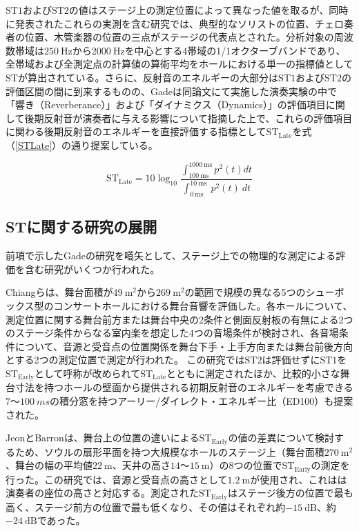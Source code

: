 \documentclass[11pt,a4j]{jreport}
\begin{document}
$\mathrm{ST1}$および$\mathrm{ST2}$の値はステージ上の測定位置によって異なった値を取るが、同時に発表されたこれらの実測を含む研究\cite{Gade1989II}では、典型的なソリストの位置、チェロ奏者の位置、木管楽器の位置の三点がステージの代表点とされた。分析対象の周波数帯域は$\SI{250}{\Hz}$から$\SI{2000}{\Hz}$を中心とする4帯域の1/1オクターブバンドであり、全帯域および全測定点の計算値の算術平均をホールにおける単一の指標値として$\mathrm{ST}$が算出されている。さらに、反射音のエネルギーの大部分は$\mathrm{ST1}$および$\mathrm{ST2}$の評価区間の間に到来するものの、Gadeは同論文にて実施した演奏実験の中で「響き（Reverberance）」および「ダイナミクス（Dynamics）」の評価項目に関して後期反射音が演奏者に与える影響について指摘した上で、これらの評価項目に関わる後期反射音のエネルギーを直接評価する指標として$\mathrm{ST_{Late}}$を式（\ref{STLate}）の通り提案している。
  
\begin{equation}
  \label{STLate}
  \mathrm{ST_{Late}}= 10 \log_{10}
  \frac{\int_{100 \: \mathrm{ms}}^{1000 \: \mathrm{ms}} p^2(t) dt}
  {\int_{0 \: \mathrm{ms}}^{10 \: \mathrm{ms}} \: p^2(t) \: dt}
\end{equation}


\subsection*{STに関する研究の展開}
前項で示したGadeの研究を嚆矢として、ステージ上での物理的な測定による評価を含む研究がいくつか行われた。

Chiangら\cite{chiang2003}は、舞台面積が$\SI{49}{\m^2}$から$\SI{269}{\m^2}$の範囲で規模の異なる5つのシューボックス型のコンサートホールにおける舞台音響を評価した。各ホールについて、測定位置に関する舞台前方または舞台中央の2条件と側面反射板の有無による2つのステージ条件からなる室内楽を想定した4つの音場条件が検討され、各音場条件について、音源と受音点の位置関係を舞台下手・上手方向または舞台前後方向とする2つの測定位置で測定が行われた。
この研究では$\mathrm{ST2}$は評価せずに$\mathrm{ST1}$を$\mathrm{ST_{Early}}$として呼称が改められて$\mathrm{ST_{Late}}$とともに測定されたほか、比較的小さな舞台寸法を持つホールの壁面から提供される初期反射音のエネルギーを考慮できる$7$〜$\SI{100}{ms}$の積分窓を持つアーリー/ダイレクト・エネルギー比（ED100）も提案された。

JeonとBarron\cite{jeon2005}は、舞台上の位置の違いによる$\mathrm{ST_{Early}}$の値の差異について検討するため、ソウルの扇形平面を持つ大規模なホールのステージ上（舞台面積$\SI{270}{\m^2}$、舞台の幅の平均値$\SI{22}{\m}$、天井の高さ$14$〜$\SI{15}{\m}$）の8つの位置で$\mathrm{ST_{Early}}$の測定を行った。この研究では、音源と受音点の高さとして$\SI{1.2}{\m}$が使用され、これはは演奏者の座位の高さと対応する。測定された$\mathrm{ST_{Early}}$はステージ後方の位置で最も高く、ステージ前方の位置で最も低くなり、その値はそれぞれ約$\SI{-15}{\dB}$、約$\SI{-24}{\dB}$であった。
\end{document}
